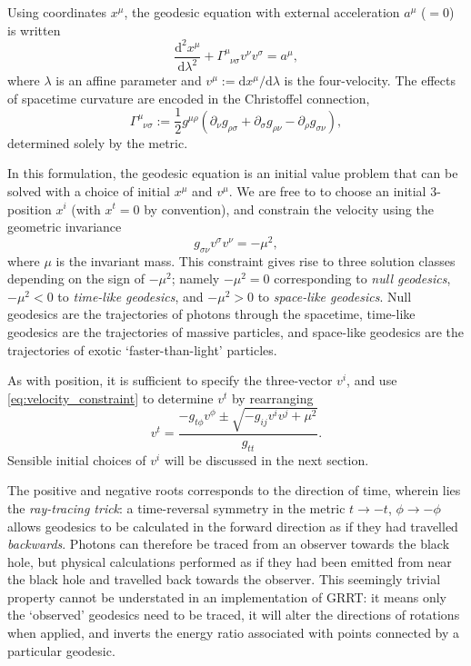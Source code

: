 \documentclass[fleqn,usenatbib]{mnras}
\renewcommand{\d}{\text{d}}
\newcommand{\utensor}[3]{#1^{#2}_{\phantom{#2}#3}}
\newcommand{\vel}[1]{v^{#1}}
\begin{document}
Using coordinates $x^\mu$, the geodesic equation with external acceleration
$a^\mu$ ($=0$) is written
\begin{equation}
\label{eq:geodesic_equation}
    \frac{\d^2 x^\mu}{\d \lambda^2}
    + \utensor{\Gamma}{\mu}{\nu\sigma}
    \vel{\nu}
    \vel{\sigma}
    = a^\mu,
\end{equation}
where $\lambda$ is an affine parameter and $v^\mu := \d x^\mu / \d \lambda$ is
the four-velocity. The effects of spacetime curvature are encoded in the
Christoffel connection,
\begin{equation}
\label{eq:christoffel}
    \utensor{\Gamma}{\mu}{\nu\sigma}
    := \frac{1}{2} g^{\mu\rho}
    \left(
        \partial_{\nu}g_{\rho \sigma}
        + \partial_{\sigma}g_{\rho \nu}
        - \partial_{\rho}g_{\sigma \nu}
    \right),
\end{equation}
determined solely by the metric.

In this formulation, the geodesic equation is an initial value
problem that can be
solved with a choice of initial $x^\mu$ and $\vel{\mu}$. We are free to to
choose an initial 3-position $x^i$ (with $x^t = 0$ by convention), and constrain
the velocity using the geometric invariance
\begin{equation}
\label{eq:velocity_constraint}
    g_{\sigma\nu} \vel{\sigma} \vel{\nu} = -\mu^2,
\end{equation}
where $\mu$ is the invariant mass. This constraint gives rise to three solution
classes depending on the sign of $-\mu^2$; namely $-\mu^2 = 0$ corresponding to
\emph{null geodesics}, $-\mu^2 < 0$ to \emph{time-like geodesics}, and $-\mu^2 >
0$ to \emph{space-like geodesics}. Null geodesics are the trajectories of
photons through the spacetime, time-like geodesics are the trajectories of
massive particles, and space-like geodesics are the trajectories of exotic
`faster-than-light' particles.

As with position, it is sufficient to specify the three-vector $\vel{i}$,
and use \eqref{eq:velocity_constraint} to determine $\vel{t}$ by rearranging
\begin{equation}
\vel{t}  = \frac{-g_{t\phi} \vel{\phi} \pm
    \sqrt{-g_{ij} \vel{i} \vel{j} + \mu^2}
}{g_{tt}}.
\end{equation}
Sensible initial choices of $v^i$ will be discussed in the next section.

The positive and negative roots corresponds to the direction of time, wherein
lies the \textit{ray-tracing trick}: a time-reversal symmetry in the metric $t
\rightarrow -t$, $\phi \rightarrow -\phi$ allows geodesics to be calculated in
the forward direction as if they had travelled \textit{backwards}. Photons can
therefore be traced from an observer towards the black hole, but physical
calculations performed as if they had been emitted from near the black hole and
travelled back towards the observer. This seemingly trivial property cannot be
understated in an implementation of GRRT: it means only the `observed' geodesics
need to be traced, it will alter the directions of rotations when
applied, and inverts the energy ratio associated with points connected by
a particular geodesic.
\end{document}
